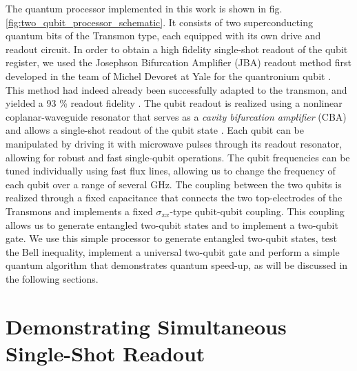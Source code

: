 The quantum processor implemented in this work is shown in fig. \ref{fig:two_qubit_processor_schematic}. It consists of two superconducting quantum bits of the Transmon type, each equipped with its own drive and readout circuit. In order to obtain  a high fidelity single-shot readout of the qubit register, we used the Josephson Bifurcation Amplifier (JBA) readout method first developed in the team of Michel Devoret at Yale for the quantronium qubit  \citep{siddiqi_rf-driven_2004,vijay_invited_2009}. This method had indeed already been   successfully adapted  to the transmon,  and yielded a 93 \% readout fidelity \citep{mallet_single-shot_2009}. The qubit readout is realized using a nonlinear coplanar-waveguide resonator that serves as a   {\it cavity bifurcation amplifier} (CBA)\citep{siddiqi_dispersive_2006,vijay_invited_2009} and allows a single-shot readout of the qubit state \citep{mallet_single-shot_2009}. Each qubit can be manipulated by driving it with microwave pulses through its readout resonator, allowing for robust and fast single-qubit operations. The qubit frequencies can be tuned individually using fast flux lines, allowing us to change the frequency of each qubit over a range of several GHz. The coupling between the two qubits is realized through a fixed capacitance that connects the two top-electrodes of the Transmons and implements a fixed $\sigma_{xx}$-type qubit-qubit coupling. This coupling allows us to generate entangled two-qubit states and to implement a two-qubit gate. We use this simple processor to generate entangled two-qubit states, test the Bell inequality, implement a  universal two-qubit gate and perform a simple quantum algorithm that demonstrates   quantum speed-up, as will be discussed in the following sections.

\section{Demonstrating Simultaneous Single-Shot Readout}

